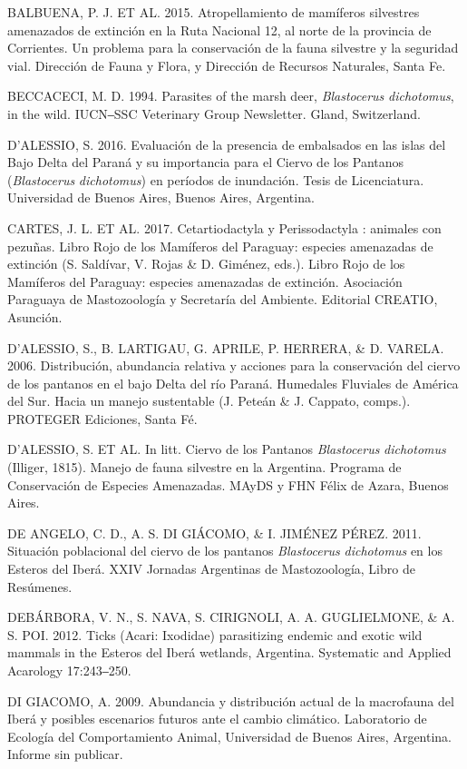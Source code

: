 \documentclass[
  x11names]{article}
\begin{document}
BALBUENA, P. J. ET AL. 2015. Atropellamiento de mamíferos silvestres
amenazados de extinción en la Ruta Nacional 12, al norte de la provincia
de Corrientes. Un problema para la conservación de la fauna silvestre y
la seguridad vial. Dirección de Fauna y Flora, y Dirección de Recursos
Naturales, Santa Fe.

BECCACECI, M. D. 1994. Parasites of the marsh deer, \textit{Blastocerus}
\textit{dichotomus}, in the wild. IUCN‒SSC Veterinary Group Newsletter.
Gland, Switzerland.

D'ALESSIO, S. 2016. Evaluación de la presencia de embalsados en las
islas del Bajo Delta del Paraná y su importancia para el Ciervo de los
Pantanos (\textit{Blastocerus} \textit{dichotomus}) en períodos de
inundación. Tesis de Licenciatura. Universidad de Buenos Aires, Buenos
Aires, Argentina.

CARTES, J. L. ET AL. 2017. Cetartiodactyla y Perissodactyla : animales
con pezuñas. Libro Rojo de los Mamíferos del Paraguay: especies
amenazadas de extinción (S. Saldívar, V. Rojas \& D. Giménez, eds.).
Libro Rojo de los Mamíferos del Paraguay: especies amenazadas de
extinción. Asociación Paraguaya de Mastozoología y Secretaría del
Ambiente. Editorial CREATIO, Asunción.

D'ALESSIO, S., B. LARTIGAU, G. APRILE, P. HERRERA, \& D. VARELA. 2006.
Distribución, abundancia relativa y acciones para la conservación del
ciervo de los pantanos en el bajo Delta del río Paraná. Humedales
Fluviales de América del Sur. Hacia un manejo sustentable (J. Peteán \&
J. Cappato, comps.). PROTEGER Ediciones, Santa Fé.

D'ALESSIO, S. ET AL. In litt. Ciervo de los Pantanos
\textit{Blastocerus} \textit{dichotomus} (Illiger, 1815). Manejo de
fauna silvestre en la Argentina. Programa de Conservación de Especies
Amenazadas. MAyDS y FHN Félix de Azara, Buenos Aires.

DE ANGELO, C. D., A. S. DI GIÁCOMO, \& I. JIMÉNEZ PÉREZ. 2011. Situación
poblacional del ciervo de los pantanos \textit{Blastocerus}
\textit{dichotomus} en los Esteros del Iberá. XXIV Jornadas Argentinas
de Mastozoología, Libro de Resúmenes.

DEBÁRBORA, V. N., S. NAVA, S. CIRIGNOLI, A. A. GUGLIELMONE, \& A. S.
POI. 2012. Ticks (Acari: Ixodidae) parasitizing endemic and exotic wild
mammals in the Esteros del Iberá wetlands, Argentina. Systematic and
Applied Acarology 17:243‒250.

DI GIACOMO, A. 2009. Abundancia y distribución actual de la macrofauna
del Iberá y posibles escenarios futuros ante el cambio climático.
Laboratorio de Ecología del Comportamiento Animal, Universidad de Buenos
Aires, Argentina. Informe sin publicar.
\end{document}
